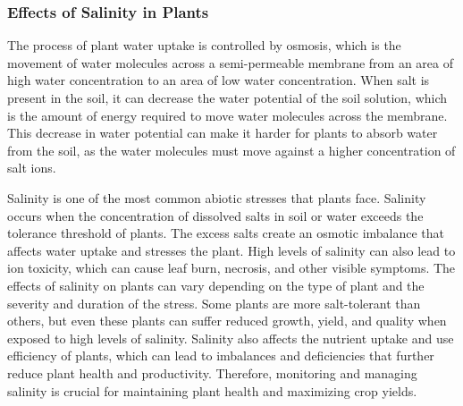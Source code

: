 \documentclass{article}
\begin{document}
{                \subsubsection{Effects of Salinity in Plants}
                The process of plant water uptake is controlled by osmosis, which is the movement of water molecules across a semi-permeable membrane from an area of high water concentration to an area of low water concentration. When salt is present in the soil, it can decrease the water potential of the soil solution, which is the amount of energy required to move water molecules across the membrane. This decrease in water potential can make it harder for plants to absorb water from the soil, as the water molecules must move against a higher concentration of salt ions.\par 
                Salinity is one of the most common abiotic stresses that plants face. Salinity occurs when the concentration of dissolved salts in soil or water exceeds the tolerance threshold of plants. The excess salts create an osmotic imbalance that affects water uptake and stresses the plant. High levels of salinity can also lead to ion toxicity, which can cause leaf burn, necrosis, and other visible symptoms. The effects of salinity on plants can vary depending on the type of plant and the severity and duration of the stress. Some plants are more salt-tolerant than others, but even these plants can suffer reduced growth, yield, and quality when exposed to high levels of salinity. Salinity also affects the nutrient uptake and use efficiency of plants, which can lead to imbalances and deficiencies that further reduce plant health and productivity. Therefore, monitoring and managing salinity is crucial for maintaining plant health and maximizing crop yields.\cite{Munns R}
}
\end{document}
